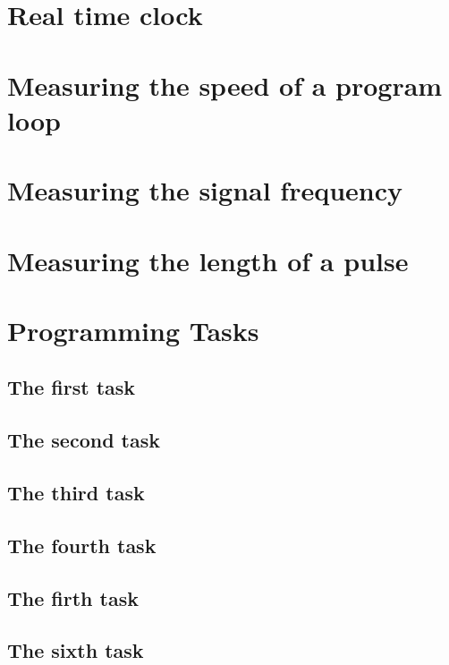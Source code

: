 \documentclass[english]{article}
\begin{document}
\section{Real time clock}

\section{Measuring the speed of a program loop}

\section{Measuring the signal frequency}

\section{Measuring the length of a pulse}

\section{Programming Tasks}

\subsection{The first task}

\subsection{The second task}

\subsection{The third task}

\subsection{The fourth task}

\subsection{The firth task}

\subsection{The sixth task}
\end{document}
